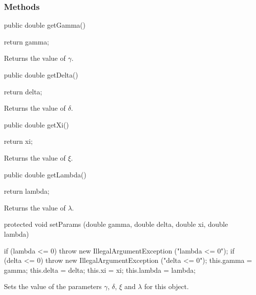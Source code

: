 \subsubsection* {Methods}
\begin{code}

   public double getGamma()\begin{hide} {
      return gamma;
   }\end{hide}
\end{code}
  \begin{tabb}
  Returns the value of $\gamma$.
 \end{tabb}
\begin{code}

   public double getDelta()\begin{hide} {
      return delta;
   }\end{hide}
\end{code}
  \begin{tabb}
  Returns the value of $\delta$.
 \end{tabb}
\begin{code}

   public double getXi()\begin{hide} {
      return xi;
   }\end{hide}
\end{code}
  \begin{tabb}
  Returns the value of $\xi$.
 \end{tabb}
\begin{code}

   public double getLambda()\begin{hide} {
      return lambda;
   }
\end{hide}
\end{code}
  \begin{tabb}
  Returns the value of $\lambda$.
 \end{tabb}
\begin{code}

   protected void setParams (double gamma, double delta, double xi,
                             double lambda)\begin{hide} {
      if (lambda <= 0)
         throw new IllegalArgumentException ("lambda <= 0");
      if (delta <= 0)
         throw new IllegalArgumentException ("delta <= 0");
      this.gamma = gamma;
      this.delta = delta;
      this.xi = xi;
      this.lambda = lambda;
   }\end{hide}
\end{code}
  \begin{tabb}
  Sets the value of the parameters $\gamma$, $\delta$, $\xi$ and
  $\lambda$ for this object.
 \end{tabb}

\begin{code}\begin{hide}
}\end{hide}
\end{code}
